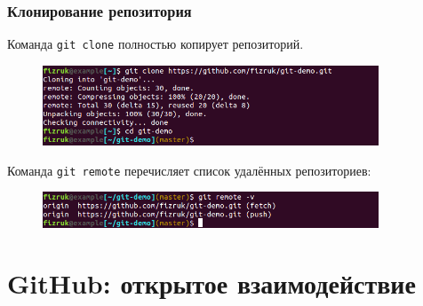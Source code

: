 \documentclass{beamer}
\begin{document}
\begin{frame}
  \frametitle{Клонирование репозитория}
  Команда \texttt{git clone} полностью копирует репозиторий.

  \begin{figure}
    \includegraphics[width=10cm]{images/git-clone.png}
  \end{figure}

  Команда \texttt{git remote} перечисляет список удалённых репозиториев:

  \begin{figure}
    \includegraphics[width=10cm]{images/git-remote.png}
  \end{figure}
\end{frame}

\section{GitHub: открытое взаимодействие}
\end{document}
